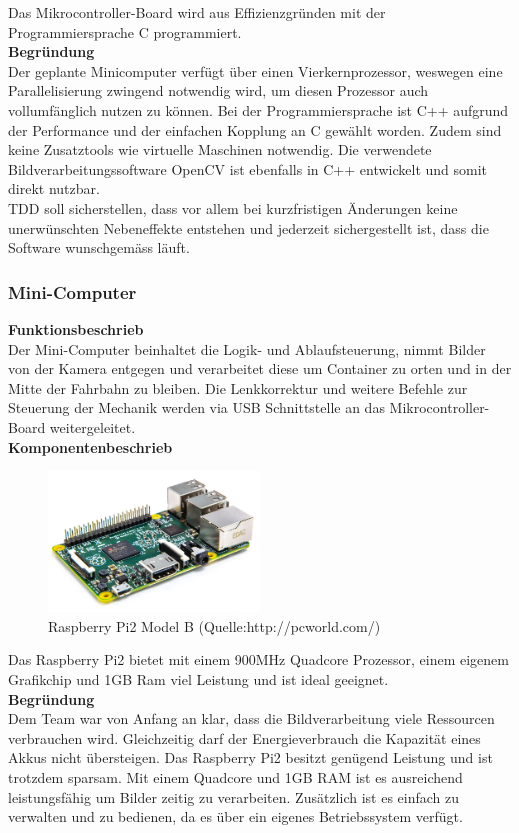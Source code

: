 Das Mikrocontroller-Board wird aus Effizienzgründen mit der Programmiersprache C programmiert.\\[0.2cm]
\textbf{Begründung}\\[0.2cm]
Der geplante Minicomputer verfügt über einen Vierkernprozessor, weswegen eine Parallelisierung zwingend notwendig wird, um diesen Prozessor auch vollumfänglich nutzen zu können. Bei der Programmiersprache ist C++ aufgrund der Performance und der einfachen Kopplung an C gewählt worden. Zudem sind keine Zusatztools wie virtuelle Maschinen notwendig. Die verwendete Bildverarbeitungssoftware OpenCV ist ebenfalls in C++ entwickelt und somit direkt nutzbar.\\
TDD soll sicherstellen, dass vor allem bei kurzfristigen Änderungen keine unerwünschten Nebeneffekte entstehen und jederzeit sichergestellt ist, dass die Software wunschgemäss läuft.
\subsubsection{Mini-Computer}
\textbf{Funktionsbeschrieb}\\[0.2cm]
Der Mini-Computer beinhaltet die Logik- und Ablaufsteuerung, nimmt Bilder von der Kamera entgegen und verarbeitet diese um Container zu orten und in der Mitte der Fahrbahn zu bleiben. Die Lenkkorrektur und weitere Befehle zur Steuerung der Mechanik werden via USB Schnittstelle an das Mikrocontroller-Board weitergeleitet.\\[0.2cm]
\textbf{Komponentenbeschrieb}
\begin{figure}[H]
	\centering
	\includegraphics[width=0.5\textwidth]{03_Loesungskonzept/pictures/raspberrypi2.png}
	\caption{Raspberry Pi2 Model B (Quelle:http://pcworld.com/)}
\end{figure}
Das Raspberry Pi2 bietet mit einem 900MHz Quadcore Prozessor, einem eigenem Grafikchip und 1GB Ram viel Leistung und ist ideal geeignet.\\[0.2cm]
\textbf{Begründung}\\[0.2cm]
Dem Team war von Anfang an klar, dass die Bildverarbeitung viele Ressourcen verbrauchen wird. Gleichzeitig darf der Energieverbrauch die Kapazität eines Akkus nicht übersteigen. Das Raspberry Pi2 besitzt genügend Leistung und ist trotzdem sparsam. Mit einem Quadcore und 1GB RAM ist es ausreichend leistungsfähig um Bilder zeitig zu verarbeiten. Zusätzlich ist es einfach zu verwalten und zu bedienen, da es über ein eigenes Betriebssystem verfügt.
